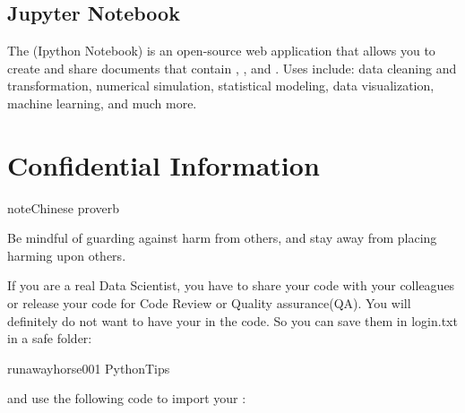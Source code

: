 \documentclass[letterpaper,12pt,english]{sphinxmanual}
\begin{document}
\begin{figure}[htbp]
\centering

\noindent{}
\end{figure}


\section{Jupyter Notebook}
\label{\detokenize{nb:jupyter-notebook}}
The  (Ipython Notebook) is an open-source web application that allows you to create and share documents that contain , ,  and . Uses include: data cleaning and transformation, numerical simulation, statistical modeling, data visualization, machine learning, and much more.

\begin{figure}[htbp]
\centering

\noindent{}
\end{figure}


\chapter{Confidential Information}
\label{\detokenize{confi:confidential-information}}\label{\detokenize{confi:confi}}\label{\detokenize{confi::doc}}
\begin{sphinxadmonition}{note}{Chinese proverb}

Be mindful of guarding against harm from others, and stay away from placing harming upon others.
\end{sphinxadmonition}

If you are a real Data Scientist, you have to share your code with your colleagues or release your code for Code Review or Quality assurance(QA). You will definitely do not want to have your  in the code. So you can save them in login.txt in a safe folder:

\begin{sphinxVerbatim}[commandchars=\\\{\}]
runawayhorse001
PythonTips
\end{sphinxVerbatim}

and use the following code to import your :
\end{document}
